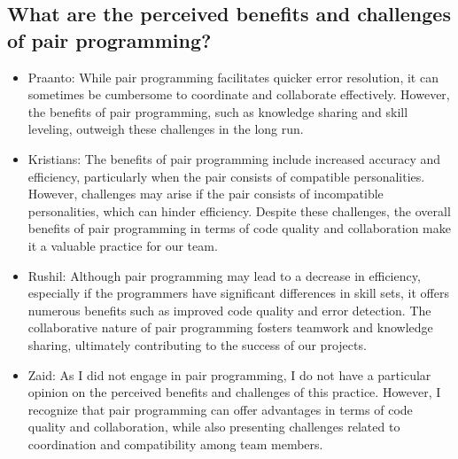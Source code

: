 \subsection{What are the perceived benefits and challenges of pair programming?}
\begin{itemize}
    \item Praanto: While pair programming facilitates quicker error resolution, it can sometimes be cumbersome to coordinate and collaborate effectively. However, the benefits of pair programming, such as knowledge sharing and skill leveling, outweigh these challenges in the long run.
    \item Kristians: The benefits of pair programming include increased accuracy and efficiency, particularly when the pair consists of compatible personalities. However, challenges may arise if the pair consists of incompatible personalities, which can hinder efficiency. Despite these challenges, the overall benefits of pair programming in terms of code quality and collaboration make it a valuable practice for our team.
    \item Rushil: Although pair programming may lead to a decrease in efficiency, especially if the programmers have significant differences in skill sets, it offers numerous benefits such as improved code quality and error detection. The collaborative nature of pair programming fosters teamwork and knowledge sharing, ultimately contributing to the success of our projects.
    \item Zaid: As I did not engage in pair programming, I do not have a particular opinion on the perceived benefits and challenges of this practice. However, I recognize that pair programming can offer advantages in terms of code quality and collaboration, while also presenting challenges related to coordination and compatibility among team members.
\end{itemize}